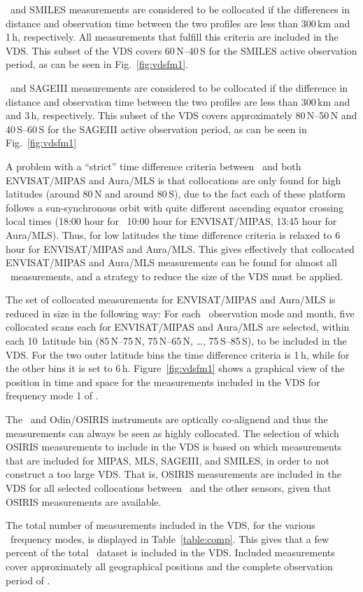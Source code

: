 \smr\ and SMILES measurements are considered to be collocated if the 
differences in distance and observation time between the two profiles are
less than 300\,km and 1\,h, respectively.
All measurements that fulfill this criteria are included
in the VDS. This subset of the VDS
covers 60\degree\,N--40\degree\,S for the SMILES
active observation period, as can be seen in Fig.~\ref{fig:vdsfm1}.

\smr\ and SAGEIII measurements are considered to be collocated if the 
difference in distance and observation time between the two profiles are
less than 300\,km and and 3\,h, respectively.
This subset of the VDS covers approximately 80\degree\,N--50\degree\,N and
40\degree\,S--60\degree\,S for the SAGEIII active observation period, as can
be seen in Fig.~\ref{fig:vdsfm1}

A problem with a ``strict'' time difference criteria
between \smr\ and both ENVISAT/MIPAS and Aura/MLS
is that collocations are only found for high latitudes
 (around 80\degree\,N and around 80\degree\,S),
due to the fact each of these platform follows a sun-synchronous orbit
with quite different ascending equator crossing local times  
(18:00 hour for \smr\, 10:00 hour for ENVISAT/MIPAS,
 13:45 hour for Aura/MLS). 
Thus, for low latitudes the time difference criteria
is relaxed to 6\,hour for ENVISAT/MIPAS and Aura/MLS.
This gives effectively that collocated ENVISAT/MIPAS and Aura/MLS 
measurements can be found for almost all \smr\ measurements, and a strategy
to reduce the size of the VDS must be applied.

The set of collocated measurements for ENVISAT/MIPAS and Aura/MLS is reduced
in size in the following way:
For each \smr\ observation mode and month, five collocated scans each
for ENVISAT/MIPAS and Aura/MLS
are selected, within each 10\degree\ latitude bin
(85\degree\,N--75\degree\,N, 75\degree\,N--65\degree\,N, \ldots, 75\degree\,S--85\degree\,S),
to be included in the VDS. For the two outer latitude bins the
time difference criteria is 1\,h, while for the other bins it is set to 6\,h.
Figure~\ref{fig:vdsfm1} shows a graphical view of the position in
time and space for the measurements included in the VDS for
frequency mode 1 of \smr.   

The \smr\ and Odin/OSIRIS instruments are optically co-alignend and thus
the measurements can always be seen as highly collocated.
The selection of which OSIRIS measurements to include in the
VDS is based on which measurements that are included 
for MIPAS, MLS, SAGEIII, and SMILES, in order to not
construct a too large VDS.  That is,
OSIRIS measurements are included in the VDS for all selected
collocations between \smr\ and the other sensors, given
that OSIRIS measurements are available. 


The total number of measurements included in the VDS, for the various \smr\ frequency modes,
is displayed in Table~\ref{table:comp}. This gives that a few percent of the total \smr\
dataset is included in the VDS. Included measurements cover approximately 
all geographical positions and the complete observation period of \smr. 
